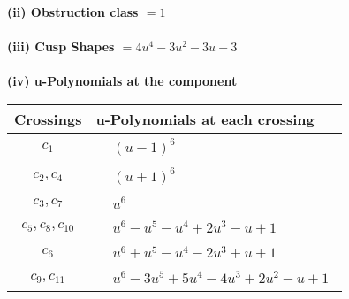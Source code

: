 \documentclass[1p]{elsarticle_modified}
\theoremstyle{definition}
\begin{document}
\flushleft \textbf{(ii) Obstruction class $= 1$}\\~\\
\flushleft \textbf{(iii) Cusp Shapes $= 4 u^4-3 u^2-3 u-3$}\\~\\
\newpage\renewcommand{\arraystretch}{1}
\flushleft \textbf{(iv) u-Polynomials at the component}\newline \\
\begin{tabular}{m{50pt}|m{274pt}}
Crossings & \hspace{64pt}u-Polynomials at each crossing \\
\hline $$\begin{aligned}c_{1}\end{aligned}$$&$\begin{aligned}
&(u-1)^6
\end{aligned}$\\
\hline $$\begin{aligned}c_{2},c_{4}\end{aligned}$$&$\begin{aligned}
&(u+1)^6
\end{aligned}$\\
\hline $$\begin{aligned}c_{3},c_{7}\end{aligned}$$&$\begin{aligned}
&u^6
\end{aligned}$\\
\hline $$\begin{aligned}c_{5},c_{8},c_{10}\end{aligned}$$&$\begin{aligned}
&u^6- u^5- u^4+2 u^3- u+1
\end{aligned}$\\
\hline $$\begin{aligned}c_{6}\end{aligned}$$&$\begin{aligned}
&u^6+u^5- u^4-2 u^3+u+1
\end{aligned}$\\
\hline $$\begin{aligned}c_{9},c_{11}\end{aligned}$$&$\begin{aligned}
&u^6-3 u^5+5 u^4-4 u^3+2 u^2- u+1
\end{aligned}$\\
\hline
\end{tabular}\\~\\
\end{document}
